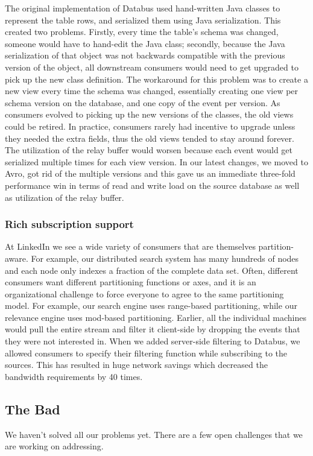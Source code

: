 The original implementation of Databus used hand-written Java classes to represent the table rows, and serialized them using Java serialization. This created two problems. Firstly, every time the table's schema was changed, someone would have to hand-edit the Java class; secondly, because the Java serialization of that object was not backwards compatible with the previous version of the object, all downstream consumers would need to get upgraded to pick up the new class definition. The workaround for this problem was to create a new view every time the schema was changed, essentially creating one view per schema version on the database, and one copy of the event per version. As consumers evolved to picking up the new versions of the classes, the old views could be retired. In practice, consumers rarely had incentive to upgrade unless they needed the extra fields, thus the old views tended to stay around forever. The utilization of the relay buffer would worsen because each event would get serialized multiple times for each view version. In our latest changes, we moved to Avro, got rid of the multiple versions and this gave us an immediate three-fold performance win in terms of read and write load on the source database as well as utilization of the relay buffer. 

\subsubsection{Rich subscription support}

At LinkedIn we see a wide variety of consumers that are themselves partition-aware. For example, our distributed search system has many hundreds of nodes and each node only indexes a fraction of the complete data set. 
Often, different consumers want different partitioning functions or axes, and it is an organizational challenge to force everyone to agree to the same partitioning model. For example, our search engine
 uses range-based partitioning, while our relevance engine uses mod-based partitioning. Earlier, all the individual machines would pull the entire stream and filter it client-side by dropping the events that they were not interested in. When we added server-side filtering to Databus, we allowed consumers to specify their filtering function while subscribing to the sources. This has resulted in huge network savings which decreased the bandwidth requirements by 40 times.
\vspace{1in}
\subsection{The Bad}
We haven't solved all our problems yet. There are a few open challenges that we are working on addressing. 

